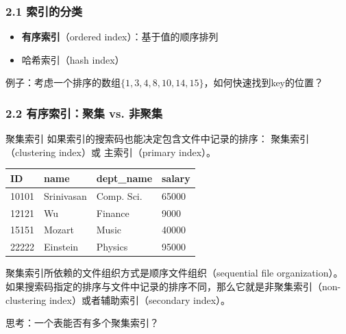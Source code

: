 \documentclass[aspectratio=169, 14pt]{beamer}
\begin{document}
\begin{frame}
    \frametitle{2.1 索引的分类}
\begin{itemize}
    \item \textbf{有序索引}（ordered index）：基于值的顺序排列
    \item 哈希索引（hash index）
\end{itemize}

\noindent\makebox[\linewidth]{\rule{\paperwidth}{0.4pt}}

例子：考虑一个排序的数组$\{1, 3, 4, 8, 10, 14, 15\}$，如何快速找到key的位置？

\end{frame}

\begin{frame}
    \frametitle{2.2 有序索引：聚集 vs. 非聚集}
\begin{exampleblock}{聚集索引}
如果索引的搜索码也能决定包含文件中记录的排序： \alert{聚集索引}（clustering index）或 主索引（primary index）。    
\end{exampleblock}

\begin{table}
    \begin{tabular}{llll}
      \toprule
      ID & name & dept\_name & salary \\
      \midrule
      10101 & Srinivasan & Comp. Sci. & 65000 \\
      12121 & Wu & Finance & 9000 \\
      15151 & Mozart & Music & 40000 \\
      22222 & Einstein & Physics & 95000 \\
      \bottomrule
    \end{tabular}
\end{table}
\end{frame}

\begin{frame}
聚集索引所依赖的文件组织方式是\alert{顺序文件组织}（sequential file organization）。
\noindent\makebox[\linewidth]{\rule{\paperwidth}{0.4pt}}
如果搜索码指定的排序与文件中记录的排序不同，那么它就是非聚集索引（non-clustering index）或者辅助索引（secondary index）。

 思考：一个表能否有多个聚集索引？
\end{frame}
\end{document}
